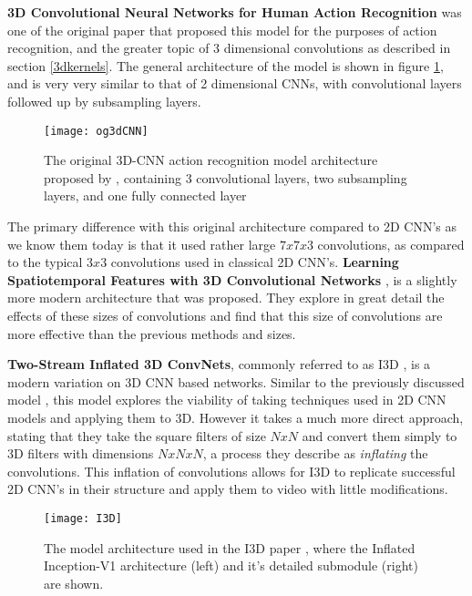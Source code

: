 \textbf{3D Convolutional Neural Networks for Human Action Recognition} \cite{3DCNN-ActionRecognition} was one of the original paper that proposed this model for the purposes of action recognition, and the greater topic of 3 dimensional convolutions as described in section \ref{3dkernels}. The general architecture of the model is shown in figure \ref{fig:original3dcnn}, and is very very similar to that of 2 dimensional CNNs, with convolutional layers followed up by subsampling layers.

\begin{figure}[h]
	\texttt{[image: og3dCNN]}
	\centering
	\caption{The original 3D-CNN action recognition model architecture proposed by \cite{3DCNN-ActionRecognition}, containing 3 convolutional layers, two subsampling layers, and one fully connected layer}
	\label{fig:original3dcnn}
\end{figure}

The primary difference with this original architecture compared to 2D CNN's as we know them today is that it used rather large $7x7x3$ convolutions, as compared to the typical $3x3$ convolutions used in classical 2D CNN's. \textbf{Learning Spatiotemporal Features with 3D Convolutional Networks} \cite{3x33dcnn}, is a slightly more modern architecture that was proposed. They explore in great detail the effects of these sizes of convolutions and find that this size of convolutions are more effective than the previous methods and sizes.

\textbf{Two-Stream Inflated 3D ConvNets}, commonly referred to as I3D \cite{i3d}, is a modern variation on 3D CNN based networks. Similar to the previously discussed model \cite{3DCNN-ActionRecognition}, this model explores the viability of taking techniques used in 2D CNN models and applying them to 3D. However it takes a much more direct approach, stating that they take the square filters of size $NxN$ and convert them simply to 3D filters with dimensions $NxNxN$, a process they describe as \textit{inflating} the convolutions. This inflation of convolutions allows for I3D to replicate successful 2D CNN's in their structure and apply them to video with little modifications.

\begin{figure}[h]
	\texttt{[image: I3D]}
	\centering
	\caption{The model architecture used in the I3D paper \cite{i3d}, where the Inflated Inception-V1 architecture (left) and it's detailed submodule (right) are shown.}
	\label{fig:I3D}
\end{figure}


